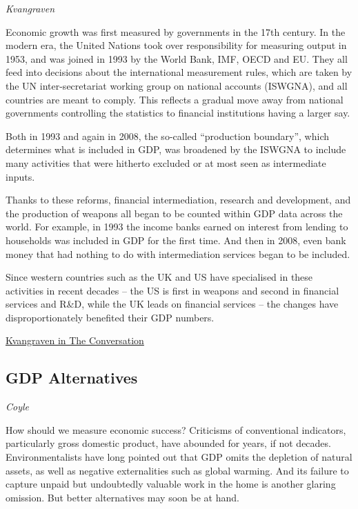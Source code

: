 \documentclass[
]{book}
\begin{document}
\emph{Kvangraven}

Economic growth was first measured by governments in the 17th century. In the modern era, the United Nations took over responsibility for measuring output in 1953, and was joined in 1993 by the World Bank, IMF, OECD and EU. They all feed into decisions about the international measurement rules, which are taken by the UN inter-secretariat working group on national accounts (ISWGNA), and all countries are meant to comply. This reflects a gradual move away from national governments controlling the statistics to financial institutions having a larger say.

Both in 1993 and again in 2008, the so-called ``production boundary'', which determines what is included in GDP, was broadened by the ISWGNA to include many activities that were hitherto excluded or at most seen as intermediate inputs.

Thanks to these reforms, financial intermediation, research and development, and the production of weapons all began to be counted within GDP data across the world. For example, in 1993 the income banks earned on interest from lending to households was included in GDP for the first time. And then in 2008, even bank money that had nothing to do with intermediation services began to be included.

Since western countries such as the UK and US have specialised in these activities in recent decades -- the US is first in weapons and second in financial services and R\&D, while the UK leads on financial services -- the changes have disproportionately benefited their GDP numbers.

\href{https://theconversation.com/gdp-numbers-are-not-what-they-seem-how-they-boost-us-and-uk-at-expense-of-developing-countries-162468}{Kvangraven in The Conversation}

\hypertarget{gdp-alternatives}{%
\subsection{GDP Alternatives}\label{gdp-alternatives}}

\emph{Coyle}

How should we measure economic success? Criticisms of conventional indicators, particularly gross domestic product, have abounded for years, if not decades. Environmentalists have long pointed out that GDP omits the depletion of natural assets, as well as negative externalities such as global warming. And its failure to capture unpaid but undoubtedly valuable work in the home is another glaring omission. But better alternatives may soon be at hand.
\end{document}
